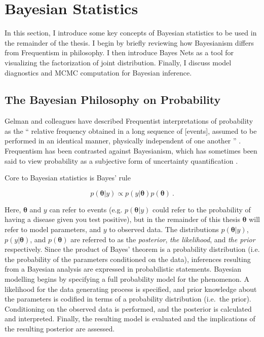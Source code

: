 \section{Bayesian Statistics}

In this section, I introduce some key concepts of Bayesian statistics to be used in the remainder of the thesis.  I begin by briefly reviewing how Bayesianism differs from Frequentism in philosophy.  I then introduce Bayes Nets as a tool for visualizing the factorization of joint distribution.  Finally, I discuss model diagnostics and MCMC computation for Bayesian inference.


\subsection{The Bayesian Philosophy on Probability}


Gelman and colleagues have described Frequentist interpretations of probability as the `` relative frequency obtained in a long sequence of [events], assumed to be performed in an identical manner, physically independent of one another ''   \cite[p.~12]{gelman2013bayesian}.   Frequentism has been contrasted against Bayesianism, which has sometimes been said to view probability as a subjective form of uncertainty quantification \cite{gelman2013bayesian}.

Core to Bayesian statistics is Bayes' rule \cite[p.~7]{gelman2013bayesian}

\begin{equation}\label{Bayes}
	p( \bm{\theta} \vert y) \propto p(y \vert \bm{\theta}) p(\bm{\theta}) \>.
\end{equation}

\noindent  Here, $ \bm{\theta} $  and $y$ can refer to events (e.g. $p(\bm{\theta} \vert y)$ could refer to the probability of having a disease given you test positive), but in the remainder of this thesis $\bm{\theta}$ will refer to model parameters, and $ y $ to observed data.  The distributions $ p( \bm{\theta} \vert y) $, $ p(y \vert \bm{\theta}) $, and $p(\bm{\theta})$ are referred to as the \textit{posterior}, \textit{the likelihood}, and \textit{the prior} respectively.  Since the product of Bayes' theorem is a probability distribution (i.e. the probability of the parameters conditioned on the data), inferences resulting from a Bayesian analysis are expressed in probabilistic statements. Bayesian modelling begins by specifying a full probability model for the phenomenon.  A likelihood for the data generating process is specified, and prior knowledge about the parameters is codified in terms of a probability distribution (i.e.\ the prior).  Conditioning on the observed data is performed, and the posterior is calculated and interpreted.  Finally, the resulting model is evaluated and the implications of the resulting posterior are assessed.  

